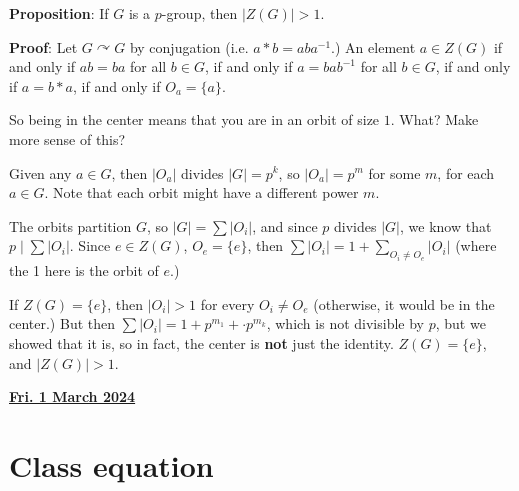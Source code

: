 \documentclass[12pt]{article}
\renewcommand{\date}[1]{\underline{\bf #1}}
\def\acts{\curvearrowright}
\begin{document}



{\bf Proposition}: If $G$ is a $p$-group, then $|Z(G)| > 1$.

{\bf Proof}: Let $G \acts G$ by conjugation (i.e. $a * b = a b a^{-1}$.) An
element $a \in Z(G)$ if and only if $ab = ba$ for all $b \in G$, if and only if
$a = b ab^{-1}$ for all $b \in G$, if and only if $a = b * a$, if and only if
$O_a = \{a\}$.

So being in the center means that you are in an orbit of size
$1$. \QUESTION{} What? Make more sense of this?

Given any $a \in G$, then $|O_a|$ divides $|G| = p^k$, so $|O_a| = p^m$ for some
$m$, for each $a \in G$. Note that each orbit might have a different power $m$.

The orbits partition $G$, so $|G| = \sum|O_i|$, and since $p$ divides $|G|$, we
know that $p \mid \sum|O_i|$. Since $e \in Z(G)$, $O_e = \{e\}$, then $\sum
|O_i| = 1 + \sum_{O_i \ne O_e} |O_i|$ (where the 1 here is the orbit of $e$.)

If $Z(G) = \{e\}$, then $|O_i| > 1$ for every $O_i \ne O_e$ (otherwise, it would
be in the center.) But then $\sum |O_i| = 1 + p^{m_1} + \cdot p^{m_k}$, which is
not divisible by $p$, but we showed that it is, so in fact, the center is {\bf
not} just the identity. $Z(G) = \{e\}$, and $|Z(G)| > 1$.

\date{Fri. 1 March 2024}

\section{Class equation}
\end{document}
